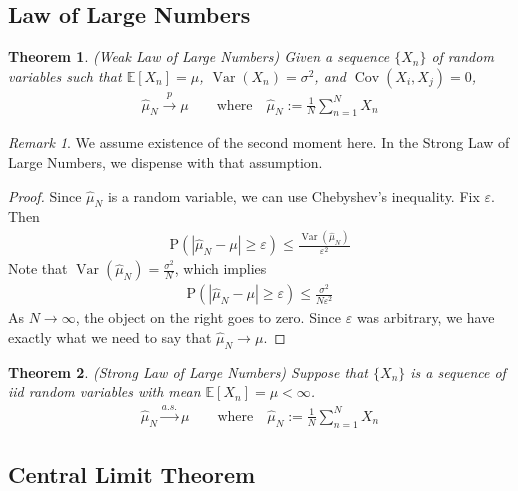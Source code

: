 \documentclass[12pt]{article}
\theoremstyle{plain}
\newtheorem{thm}{Theorem}[section]
\theoremstyle{definition}
\theoremstyle{remark}
\newtheorem*{rmk}{Remark}
\newcommand{\Prb}{\mathrm{P}}
\newcommand{\ra}{\rightarrow}
\newcommand{\E}{\mathbb{E}}
\newcommand{\Cov}{\operatorname{Cov}}
\newcommand{\Var}{\operatorname{Var}}
\newcommand{\asto}{\xrightarrow{a.s.}}
\newcommand{\pto}{\xrightarrow{p}}
\newcommand{\sumnN}{\sum^N_{n=1}}
\begin{document}

\clearpage
\subsection{Law of Large Numbers}

\begin{thm}\emph{(Weak Law of Large Numbers)}
Given a sequence $\{X_n\}$ of random variables such that
$\E[X_n]=\mu$, $\Var(X_n)=\sigma^2$, and $\Cov(X_i,X_j)=0$,
\begin{align*}
  \hat{\mu}_N \pto \mu
  \qquad\text{where} \quad
  \hat{\mu}_N := \frac{1}{N} \sumnN X_n
\end{align*}
\end{thm}
\begin{rmk}
We assume existence of the second moment here. In the Strong Law of
Large Numbers, we dispense with that assumption.
\end{rmk}
\begin{proof}
Since $\hat{\mu}_N$ is a random variable, we can use Chebyshev's
inequality. Fix $\varepsilon$. Then
\begin{align*}
  \Prb(|\hat{\mu}_N -\mu| \geq \varepsilon)
  \leq \frac{\Var(\hat{\mu}_N)}{\varepsilon^2}
\end{align*}
Note that $\Var(\hat{\mu}_N) = \frac{\sigma^2}{N}$, which implies
\begin{align*}
  \Prb(|\hat{\mu}_N -\mu| \geq \varepsilon)
  \leq \frac{\sigma^2}{N\varepsilon^2}
\end{align*}
As $N\ra\infty$, the object on the right goes to zero. Since
$\varepsilon$ was arbitrary, we have exactly what we need to say that
$\hat{\mu}_N\ra\mu$.
\end{proof}

\begin{thm}\emph{(Strong Law of Large Numbers)}
Suppose that $\{X_n\}$ is a sequence of iid random variables with mean
$\E[X_n]=\mu<\infty$.
\begin{align*}
  \hat{\mu}_N \asto \mu
  \qquad\text{where} \quad
  \hat{\mu}_N := \frac{1}{N} \sumnN X_n
\end{align*}
\end{thm}


\clearpage
\subsection{Central Limit Theorem}
\end{document}
